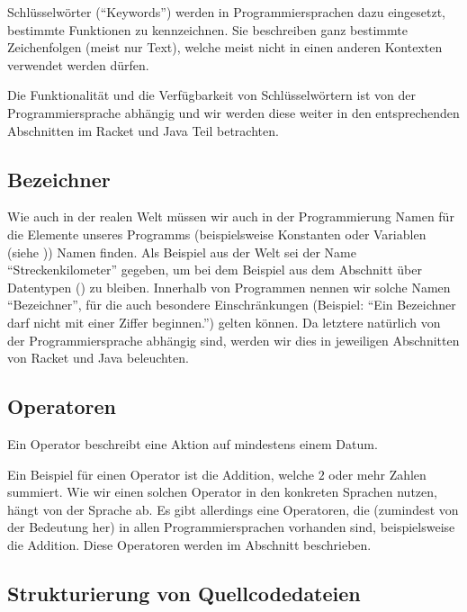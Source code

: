 	Schlüsselwörter (\enquote{Keywords}) werden in Programmiersprachen dazu eingesetzt, bestimmte Funktionen zu kennzeichnen. Sie beschreiben ganz bestimmte Zeichenfolgen (meist nur Text), welche meist nicht in einen anderen Kontexten verwendet werden dürfen.
	
	Die Funktionalität und die Verfügbarkeit von Schlüsselwörtern ist von der Programmiersprache abhängig und wir werden diese weiter in den entsprechenden Abschnitten im Racket und Java Teil betrachten.

\subsection{Bezeichner} \functionalMark \imperativeMark \oopMark
	
	Wie auch in der realen Welt müssen wir auch in der Programmierung Namen für die Elemente unseres Programms (beispielsweise Konstanten oder Variablen (siehe )) Namen finden. Als Beispiel aus der Welt sei der Name \enquote{Streckenkilometer} gegeben, um bei dem Beispiel aus dem Abschnitt über Datentypen () zu bleiben. Innerhalb von Programmen nennen wir solche Namen \enquote{Bezeichner}, für die auch besondere Einschränkungen (Beispiel: \enquote{Ein Bezeichner darf nicht mit einer Ziffer beginnen.}) gelten können. Da letztere natürlich von der Programmiersprache abhängig sind, werden wir dies in jeweiligen Abschnitten von Racket und Java beleuchten.

\subsection{Operatoren} \functionalMark \imperativeMark \oopMark

	Ein Operator beschreibt eine Aktion auf mindestens einem Datum.
	
	Ein Beispiel für einen Operator ist die Addition, welche $ 2 $ oder mehr Zahlen summiert. Wie wir einen solchen Operator in den konkreten Sprachen nutzen, hängt von der Sprache ab. Es gibt allerdings eine Operatoren, die (zumindest von der Bedeutung her) in allen Programmiersprachen vorhanden sind, beispielsweise die Addition. Diese Operatoren werden im Abschnitt  beschrieben.

\subsection{Strukturierung von Quellcodedateien} \functionalMark \imperativeMark \oopMark
	
